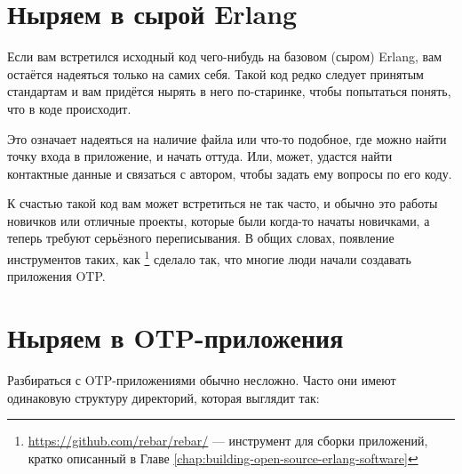 \section{Ныряем в сырой Erlang}
\label{sec:dive-raw-erlang}

Если вам встретился исходный код чего-нибудь на базовом (сыром) Erlang, вам остаётся надеяться только на самих себя. Такой код редко следует принятым стандартам и вам придётся нырять в него по-старинке, чтобы попытаться понять, что в коде происходит.

Это означает надеяться на наличие файла  или что-то подобное, где можно найти точку входа в приложение, и начать оттуда. Или, может, удастся найти контактные данные и связаться с автором, чтобы задать ему вопросы по его коду.

К счастью такой код вам может встретиться не так часто, и обычно это работы новичков или отличные проекты, которые были когда-то начаты новичками, а теперь требуют серьёзного переписывания. В общих словах, появление инструментов таких, как \footnote{\href{https://github.com/rebar/rebar/}{https://github.com/rebar/rebar/} — инструмент для сборки приложений, кратко описанный в Главе \ref{chap:building-open-source-erlang-software}} сделало так, что многие люди начали создавать приложения OTP.


\section{Ныряем в OTP-приложения}
\label{sec:dive-otp-applications}

Разбираться с OTP-приложениями обычно несложно. Часто они имеют одинаковую структуру директорий, которая выглядит так:

